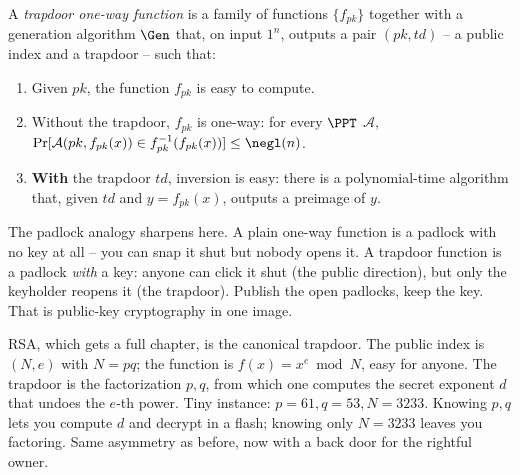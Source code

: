 \begin{definition}
\label{ch08:def-tdf}
A \emph{trapdoor one-way function} is a family of functions $\{f_{pk}\}$ together with a generation algorithm $\Gen$ that, on input $1^{n}$, outputs a pair $(pk, td)$ -- a public index and a trapdoor -- such that:
\begin{enumerate}
\item Given $pk$, the function $f_{pk}$ is easy to compute.
\item Without the trapdoor, $f_{pk}$ is one-way: for every $\PPT$ $\mathcal A$, $\Pr[\mathcal A(pk, f_{pk}(x)) \in f_{pk}^{-1}(f_{pk}(x))] \le \negl(n)$.
\item \textbf{With} the trapdoor $td$, inversion is easy: there is a polynomial-time algorithm that, given $td$ and $y=f_{pk}(x)$, outputs a preimage of $y$.
\end{enumerate}
\end{definition}

The padlock analogy sharpens here. A plain one-way function is a padlock with no key at all -- you can snap it shut but nobody opens it. A trapdoor function is a padlock \emph{with} a key: anyone can click it shut (the public direction), but only the keyholder reopens it (the trapdoor). Publish the open padlocks, keep the key. That is public-key cryptography in one image.

\begin{intuitionbox}
RSA, which gets a full chapter, is the canonical trapdoor. The public index is $(N,e)$ with $N=pq$; the function is $f(x)=x^{e}\bmod N$, easy for anyone. The trapdoor is the factorization $p,q$, from which one computes the secret exponent $d$ that undoes the $e$-th power. Tiny instance: $p=61, q=53, N=3233$. Knowing $p,q$ lets you compute $d$ and decrypt in a flash; knowing only $N=3233$ leaves you factoring. Same asymmetry as before, now with a back door for the rightful owner.
\end{intuitionbox}

